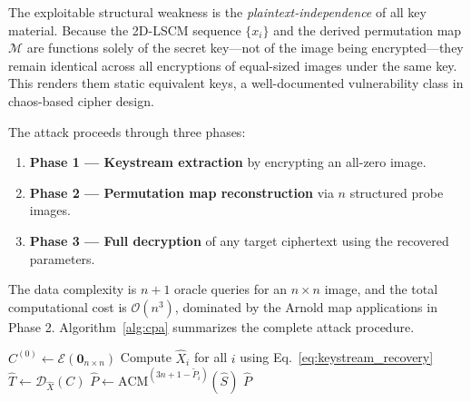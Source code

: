 The exploitable structural weakness is the \emph{plaintext-independence} of all key material. Because the 2D-LSCM sequence $\{x_i\}$ and the derived permutation map $\mathcal{M}$ are functions solely of the secret key---not of the image being encrypted---they remain identical across all encryptions of equal-sized images under the same key. This renders them static equivalent keys, a well-documented vulnerability class in chaos-based cipher design.

The attack proceeds through three phases:
\begin{enumerate}
    \item \textbf{Phase 1 --- Keystream extraction} by encrypting an all-zero image.
    \item \textbf{Phase 2 --- Permutation map reconstruction} via $n$ structured probe images.
    \item \textbf{Phase 3 --- Full decryption} of any target ciphertext using the recovered parameters.
\end{enumerate}

The data complexity is $n + 1$ oracle queries for an $n \times n$ image, and the total computational cost is $\mathcal{O}(n^3)$, dominated by the Arnold map applications in Phase 2. Algorithm~\ref{alg:cpa} summarizes the complete attack procedure.

\begin{algorithm}[t]
\LinesNumbered
\caption{Chosen-Plaintext Attack on the Target Scheme}
\label{alg:cpa}
\SetAlgoLined
{}
\BlankLine
{}
$C^{(0)} \leftarrow \mathcal{E}(\mathbf{0}_{n \times n})$\;
Compute $\hat{X}_i$ for all $i$ using Eq.~\eqref{eq:keystream_recovery}\;
\BlankLine
{}
\BlankLine
{}
$\hat{T} \leftarrow \mathcal{D}_{\hat{X}}(C)$\;
$\hat{P} \leftarrow \mathrm{ACM}^{(3n+1-\tilde{P}_i)}(\hat{S})$\;
\Return $\hat{P}$
\end{algorithm}

